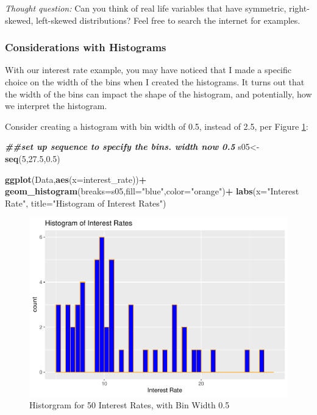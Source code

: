 \documentclass[
]{book}
\newenvironment{Shaded}{\begin{snugshade}}{\end{snugshade}}
\newcommand{\AttributeTok}[1]{\textcolor[rgb]{0.13,0.29,0.53}{#1}}
\newcommand{\DecValTok}[1]{\textcolor[rgb]{0.00,0.00,0.81}{#1}}
\newcommand{\DocumentationTok}[1]{\textcolor[rgb]{0.56,0.35,0.01}{\textbf{\textit{#1}}}}
\newcommand{\FloatTok}[1]{\textcolor[rgb]{0.00,0.00,0.81}{#1}}
\newcommand{\FunctionTok}[1]{\textcolor[rgb]{0.13,0.29,0.53}{\textbf{#1}}}
\newcommand{\NormalTok}[1]{#1}
\newcommand{\OtherTok}[1]{\textcolor[rgb]{0.56,0.35,0.01}{#1}}
\newcommand{\SpecialCharTok}[1]{\textcolor[rgb]{0.81,0.36,0.00}{\textbf{#1}}}
\newcommand{\StringTok}[1]{\textcolor[rgb]{0.31,0.60,0.02}{#1}}
\begin{document}
\emph{Thought question:} Can you think of real life variables that have symmetric, right-skewed, left-skewed distributions? Feel free to search the internet for examples.

\hypertarget{considerations-with-histograms}{%
\subsubsection{Considerations with Histograms}\label{considerations-with-histograms}}

With our interest rate example, you may have noticed that I made a specific choice on the width of the bins when I created the histograms. It turns out that the width of the bins can impact the shape of the histogram, and potentially, how we interpret the histogram.

Consider creating a histogram with bin width of 0.5, instead of 2.5, per Figure \ref{fig:hist05}:

\begin{Shaded}
\begin{Highlighting}[]
\DocumentationTok{\#\#set up sequence to specify the bins. width now 0.5}
\NormalTok{s05}\OtherTok{\textless{}{-}}\FunctionTok{seq}\NormalTok{(}\DecValTok{5}\NormalTok{,}\FloatTok{27.5}\NormalTok{,}\FloatTok{0.5}\NormalTok{)}

\FunctionTok{ggplot}\NormalTok{(Data,}\FunctionTok{aes}\NormalTok{(}\AttributeTok{x=}\NormalTok{interest\_rate))}\SpecialCharTok{+}
  \FunctionTok{geom\_histogram}\NormalTok{(}\AttributeTok{breaks=}\NormalTok{s05,}\AttributeTok{fill=}\StringTok{"blue"}\NormalTok{,}\AttributeTok{color=}\StringTok{"orange"}\NormalTok{)}\SpecialCharTok{+}
  \FunctionTok{labs}\NormalTok{(}\AttributeTok{x=}\StringTok{"Interest Rate"}\NormalTok{, }\AttributeTok{title=}\StringTok{"Histogram of Interest Rates"}\NormalTok{)}
\end{Highlighting}
\end{Shaded}

\begin{figure}
\centering
\includegraphics{bookdown-demo_files/figure-latex/hist05-1.pdf}
\caption{\label{fig:hist05}Historgram for 50 Interest Rates, with Bin Width 0.5}
\end{figure}
\end{document}
